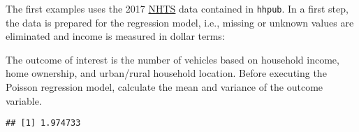 \documentclass[
]{article}
\newenvironment{Shaded}{\begin{snugshade}}{\end{snugshade}}
\newcommand{\DecValTok}[1]{\textcolor[rgb]{0.00,0.00,0.81}{#1}}
\newcommand{\FloatTok}[1]{\textcolor[rgb]{0.00,0.00,0.81}{#1}}
\newcommand{\KeywordTok}[1]{\textcolor[rgb]{0.13,0.29,0.53}{\textbf{#1}}}
\newcommand{\NormalTok}[1]{#1}
\newcommand{\OperatorTok}[1]{\textcolor[rgb]{0.81,0.36,0.00}{\textbf{#1}}}
\newcommand{\StringTok}[1]{\textcolor[rgb]{0.31,0.60,0.02}{#1}}
\begin{document}
The first examples uses the 2017 \href{https://nhts.ornl.gov/}{NHTS} data contained in \texttt{hhpub}. In a first step, the data is prepared for the regression model, i.e., missing or unknown values are eliminated and income is measured in dollar terms:

\begin{Shaded}
\end{Shaded}

The outcome of interest is the number of vehicles based on household income, home ownership, and urban/rural household location. Before executing the Poisson regression model, calculate the mean and variance of the outcome variable.

\begin{verbatim}
## [1] 1.974733
\end{verbatim}
\end{document}
